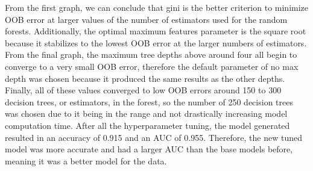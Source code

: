 \documentclass{article}
\begin{document}
From the first graph, we can conclude that gini is the better criterion to minimize OOB error at larger values of the number of estimators used for the random forests. Additionally, the optimal maximum features parameter is the square root because it stabilizes to the lowest OOB error at the larger numbers of estimators. From the final graph, the maximum tree depths above around four all begin to converge to a very small OOB error, therefore the default parameter of no max depth was chosen because it produced the same results as the other depths. Finally, all of these values converged to low OOB errors around 150 to 300 decision trees, or estimators, in the forest, so the number of 250 decision trees was chosen due to it being in the range and not drastically increasing model computation time. After all the hyperparameter tuning, the model generated resulted in an accuracy of 0.915 and an AUC of 0.955. Therefore, the new tuned model was more accurate and had a larger AUC than the base models before, meaning it was a better model for the data.
\vspace*{-4mm}
\end{document}
